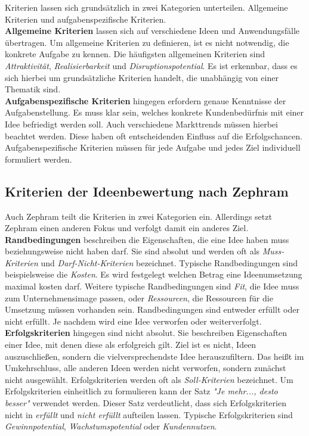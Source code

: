 Kriterien lassen sich grundsätzlich in zwei Kategorien unterteilen. Allgemeine Kriterien und aufgabenspezifische Kriterien.\\
\textbf{Allgemeine Kriterien} lassen sich auf verschiedene Ideen und Anwendungsfälle übertragen.
Um allgemeine Kriterien zu definieren, ist es nicht notwendig, die konkrete Aufgabe zu kennen. 
Die häufigsten allgemeinen Kriterien sind \textit{Attraktivität}, \textit{Realisierbarkeit} und 
\textit{Disruptionspotential}. Es ist erkennbar, dass es sich hierbei um grundsätzliche Kriterien handelt, die unabhängig von einer Thematik sind.\\
\textbf{Aufgabenspezifische Kriterien} hingegen erfordern genaue Kenntnisse der Aufgabenstellung. Es muss klar sein, welches 
konkrete Kundenbedürfnis mit einer Idee befriedigt werden soll. Auch verschiedene Markttrends müssen hierbei beachtet werden. 
Diese haben oft entscheidenden Einfluss auf die Erfolgschancen. Aufgabenspezifische Kriterien müssen für jede Aufgabe und jedes Ziel 
individuell formuliert werden.
\cite{grossklaus:2008}

\subsection{Kriterien der Ideenbewertung nach Zephram}
Auch Zephram teilt die Kriterien in zwei Kategorien ein. Allerdings setzt Zephram einen anderen Fokus und verfolgt 
damit ein anderes Ziel.\\

\textbf{Randbedingungen} beschreiben die Eigenschaften, die eine Idee haben muss
beziehungsweise nicht haben darf. Sie sind absolut und werden oft als \textit{Muss-Kriterien}
und \textit{Darf-Nicht-Kriterien} bezeichnet.
Typische Randbedingungen sind beispielsweise die \textit{Kosten}. 
Es wird festgelegt welchen Betrag eine Ideenumsetzung maximal kosten darf. 
Weitere typische Randbedingungen sind \textit{Fit}, die Idee muss zum Unternehmensimage passen, oder \textit{Ressourcen}, die Ressourcen für die
Umsetzung müssen vorhanden sein. 
Randbedingungen sind entweder erfüllt oder nicht erfüllt. Je nachdem wird eine Idee verworfen oder weiterverfolgt. \\

\textbf{Erfolgskriterien} hingegen sind nicht absolut. Sie beschreiben Eigenschaften einer Idee, 
mit denen diese als erfolgreich gilt. Ziel ist es nicht, Ideen auszuschließen, sondern die
vielversprechendste Idee herauszufiltern. Das heißt im Umkehrschluss, alle anderen Ideen werden nicht 
verworfen, sondern zunächst nicht ausgewählt. Erfolgskriterien werden oft als \textit{Soll-Kriterien} bezeichnet. Um 
Erfolgskriterien einheitlich zu formulieren kann der Satz \textit{"Je mehr..., desto besser"} verwendet werden.
Dieser Satz verdeutlicht, dass sich Erfolgskriterien nicht in \textit{erfüllt} und \textit{nicht erfüllt} aufteilen 
lassen. Typische Erfolgskriterien sind \textit{Gewinnpotential}, \textit{Wachstumspotential} oder \textit{Kundennutzen}.\\

